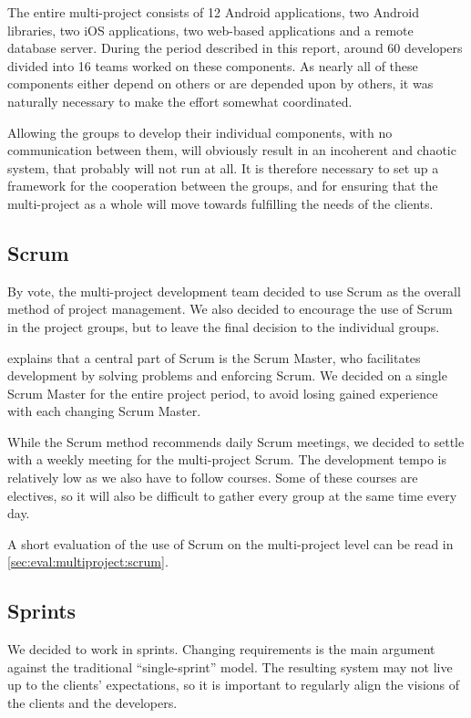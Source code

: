The entire \giraf multi-project consists of 12 Android applications, two Android libraries, two iOS applications, two web-based applications and a remote database server.
During the period described in this report, around 60 developers divided into 16 teams worked on these components. 
As nearly all of these components either depend on others or are depended upon by others, it was naturally necessary to make the effort somewhat coordinated. 

Allowing the groups to develop their individual components, with no communication between them, will obviously result in an incoherent and chaotic system, that probably will not run at all. 
It is therefore necessary to set up a framework for the cooperation between the groups, and for ensuring that the multi-project as a whole will move towards fulfilling the needs of the clients.

\subsection{Scrum}\label{sec:collab:multiproject:scrum}
By vote, the multi-project development team decided to use Scrum as the overall method of project management. 
We also decided to encourage the use of Scrum in the project groups, but to leave the final decision to the individual groups. 

\citet{larmanAgile} explains that a central part of Scrum is the Scrum Master, who facilitates development by solving problems and enforcing Scrum. 
We decided on a single Scrum Master for the entire project period, to avoid losing gained experience with each changing Scrum Master.

While the Scrum method recommends daily Scrum meetings, we decided to settle with a weekly meeting for the multi-project Scrum. The development tempo is relatively low as we also have to follow courses. 
Some of these courses are electives, so it will also be difficult to gather every group at the same time every day.

A short evaluation of the use of Scrum on the multi-project level can be read in \cref{sec:eval:multiproject:scrum}.

\subsection{Sprints}
We decided to work in sprints. 
Changing requirements is the main argument against the traditional ``single-sprint'' model. 
The resulting system may not live up to the clients' expectations, so it is important to regularly align the visions of the clients and the developers. 

